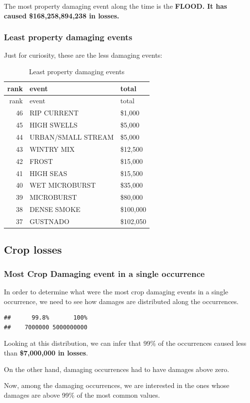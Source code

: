 \documentclass[]{article}
\begin{document}
The most property damaging event along the time is the \textbf{FLOOD. It
has caused \$168,258,894,238 in losses.}

\subsubsection{Least property damaging
events}\label{least-property-damaging-events}

Just for curiosity, these are the less damaging events:

\begin{longtable}[]{@{}rll@{}}
\caption{Least property damaging events}\tabularnewline
\toprule
rank & event & total\tabularnewline
\midrule
\endfirsthead
\toprule
rank & event & total\tabularnewline
\midrule
\endhead
46 & RIP CURRENT & \$1,000\tabularnewline
45 & HIGH SWELLS & \$5,000\tabularnewline
44 & URBAN/SMALL STREAM & \$5,000\tabularnewline
43 & WINTRY MIX & \$12,500\tabularnewline
42 & FROST & \$15,000\tabularnewline
41 & HIGH SEAS & \$15,500\tabularnewline
40 & WET MICROBURST & \$35,000\tabularnewline
39 & MICROBURST & \$80,000\tabularnewline
38 & DENSE SMOKE & \$100,000\tabularnewline
37 & GUSTNADO & \$102,050\tabularnewline
\bottomrule
\end{longtable}

\subsection{Crop losses}\label{crop-losses}

\subsubsection{Most Crop Damaging event in a single
occurrence}\label{most-crop-damaging-event-in-a-single-occurrence}

In order to determine what were the most crop damaging events in a
single occurrence, we need to see how damages are distributed along the
occurrences.

\begin{verbatim}
##      99.8%       100% 
##    7000000 5000000000
\end{verbatim}

Looking at this distribution, we can infer that 99\% of the occurrences
caused less than \textbf{\$7,000,000 in losses}.

On the other hand, damaging occurrences had to have damages above zero.

Now, among the damaging occurrences, we are interested in the ones whose
damages are above 99\% of the most common values.
\end{document}
